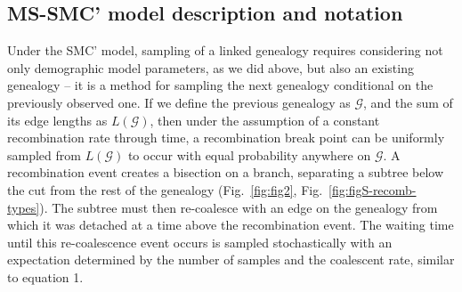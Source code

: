 \documentclass[11pt]{article}
\begin{document}

\subsection{MS-SMC' model description and notation}

Under the SMC' model, sampling of a linked genealogy requires considering not only 
demographic model parameters, 
as we did above, but also an existing genealogy -- it is a method 
for sampling the next genealogy conditional on the previously observed one. 
If we define the previous genealogy as $\mathcal{G}$, and the sum of its edge lengths 
as $L(\mathcal{G})$, then under the assumption of a constant recombination rate through time,
a recombination break point can be uniformly sampled from $L(\mathcal{G})$ to occur with 
equal probability anywhere on $\mathcal{G}$. 
A recombination event creates a bisection on a branch, separating a subtree 
below the cut from the rest of the genealogy 
(Fig.~\ref{fig:fig2}, Fig.~\ref{fig:figS-recomb-types}).
The subtree must then re-coalesce 
with an edge on the genealogy from which it was detached at a time
above the recombination event.
The waiting time until 
this re-coalescence event occurs is sampled stochastically with an expectation 
determined by the number of samples and the coalescent rate, 
similar to equation 1.
\end{document}
